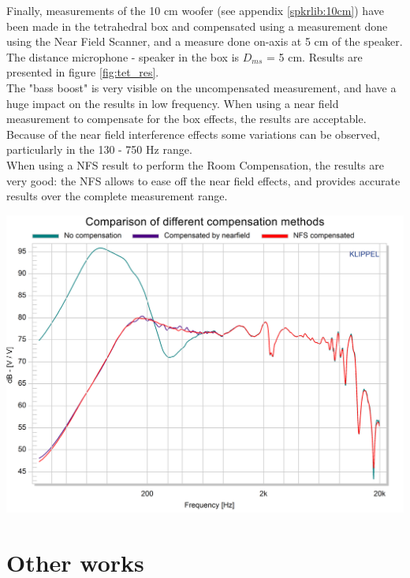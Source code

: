 \documentclass{report}
\begin{document}
\begin{minipage}{0.6\textwidth}
Finally, measurements of the 10 cm woofer (see appendix \ref{spkrlib:10cm}) have been made in the tetrahedral box and compensated using a measurement done using the Near Field Scanner, and a measure done on-axis at 5 cm of the speaker.\\
The distance microphone - speaker in the box is $D_{ms}$ = 5 cm. Results are presented in figure \ref{fig:tet_res}.\\

The "bass boost" is very visible on the uncompensated measurement, and have a huge impact on the results in low frequency. When using a near field measurement to compensate for the box effects, the results are acceptable. Because of the near field interference effects some variations can be observed, particularly in the 130 - 750 Hz range. \\
When using a NFS result to perform the Room Compensation, the results are very good: the NFS allows to ease off the near field effects, and provides accurate results over the complete measurement range. 
\end{minipage}
\begin{minipage}{0.4\textwidth}
\begin{center}
	\includegraphics[width=\textwidth]{RoomComp/tetbox_res} 
    \captionsetup{hypcap=false} 
	\label{fig:tet_res}
\end{center}
\end{minipage}

\section{Other works}
\end{document}
